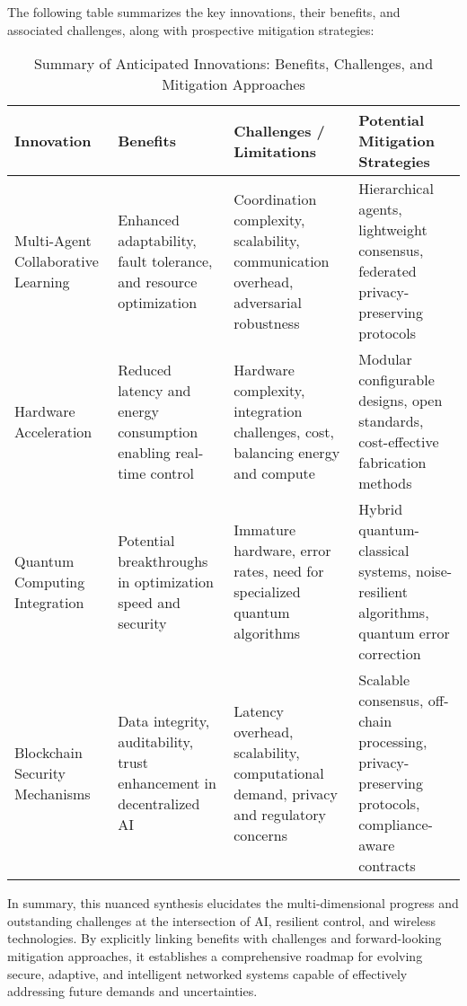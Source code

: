 \documentclass[sigconf]{acmart}
\begin{document}
\bigskip

The following table summarizes the key innovations, their benefits, and associated challenges, along with prospective mitigation strategies:

\begin{table*}[htbp]
\centering
\caption{Summary of Anticipated Innovations: Benefits, Challenges, and Mitigation Approaches}
\label{tab:anticipated_innovations}
\begin{adjustbox}{max width=\textwidth}
\begin{tabular}{@{}llll@{}}
\toprule
\textbf{Innovation} &
  \textbf{Benefits} &
  \textbf{Challenges / Limitations} &
  \textbf{Potential Mitigation Strategies} \\ \midrule
Multi-Agent Collaborative Learning &
  Enhanced adaptability, fault tolerance, and resource optimization~\cite{ref49} &
  Coordination complexity, scalability, communication overhead, adversarial robustness &
  Hierarchical agents, lightweight consensus, federated privacy-preserving protocols \\
Hardware Acceleration &
  Reduced latency and energy consumption enabling real-time control~\cite{ref50} &
  Hardware complexity, integration challenges, cost, balancing energy and compute &
  Modular configurable designs, open standards, cost-effective fabrication methods \\
Quantum Computing Integration &
  Potential breakthroughs in optimization speed and security &
  Immature hardware, error rates, need for specialized quantum algorithms &
  Hybrid quantum-classical systems, noise-resilient algorithms, quantum error correction \\
Blockchain Security Mechanisms &
  Data integrity, auditability, trust enhancement in decentralized AI~\cite{ref54} &
  Latency overhead, scalability, computational demand, privacy and regulatory concerns &
  Scalable consensus, off-chain processing, privacy-preserving protocols, compliance-aware contracts \\
\bottomrule
\end{tabular}
\end{adjustbox}
\end{table*}

In summary, this nuanced synthesis elucidates the multi-dimensional progress and outstanding challenges at the intersection of AI, resilient control, and wireless technologies. By explicitly linking benefits with challenges and forward-looking mitigation approaches, it establishes a comprehensive roadmap for evolving secure, adaptive, and intelligent networked systems capable of effectively addressing future demands and uncertainties.
\end{document}
